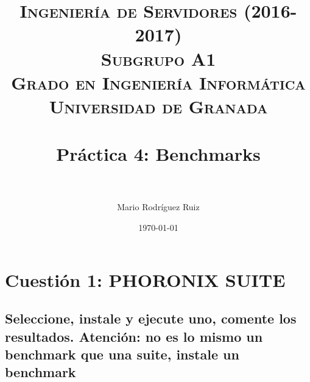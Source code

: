 


\title{	
\normalfont \normalsize 
\textsc{\textbf{Ingeniería de Servidores (2016-2017)} \\ Subgrupo A1 \\ Grado en Ingeniería Informática\\ Universidad de Granada} \\ [25pt] %
\horrule{0.5pt} \\[0.4cm] %
\huge Práctica 4: Benchmarks \\ %
\horrule{2pt} \\[0.5cm] %
}

\author{Mario Rodríguez Ruiz} %

\date{\normalsize\today} %




\maketitle %

\newpage %

\tableofcontents %

\listoffigures

\listoftables

\newpage


\section{Cuestión 1: PHORONIX SUITE}
\subsection{Seleccione, instale y ejecute uno, comente los resultados.
	Atención: no es lo mismo un benchmark que una suite, instale un
	benchmark}

